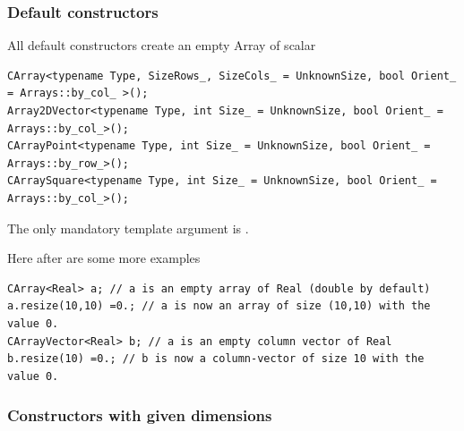 \documentclass[a4paper,10pt]{article}
\begin{document}
\subsubsection{Default constructors}
All default constructors create an empty Array of scalar 
\begin{lstlisting}[style=customcpp]
CArray<typename Type, SizeRows_, SizeCols_ = UnknownSize, bool Orient_ = Arrays::by_col_ >();
Array2DVector<typename Type, int Size_ = UnknownSize, bool Orient_ = Arrays::by_col_>();
CArrayPoint<typename Type, int Size_ = UnknownSize, bool Orient_ = Arrays::by_row_>();
CArraySquare<typename Type, int Size_ = UnknownSize, bool Orient_ = Arrays::by_col_>();
\end{lstlisting}
\begin{note}
The only mandatory template argument is .
\end{note}

Here after are some more examples
\begin{lstlisting}[style=customcpp]
CArray<Real> a; // a is an empty array of Real (double by default)
a.resize(10,10) =0.; // a is now an array of size (10,10) with the value 0.
CArrayVector<Real> b; // a is an empty column vector of Real
b.resize(10) =0.; // b is now a column-vector of size 10 with the value 0.
\end{lstlisting}

\subsubsection{Constructors with given dimensions}
\end{document}
